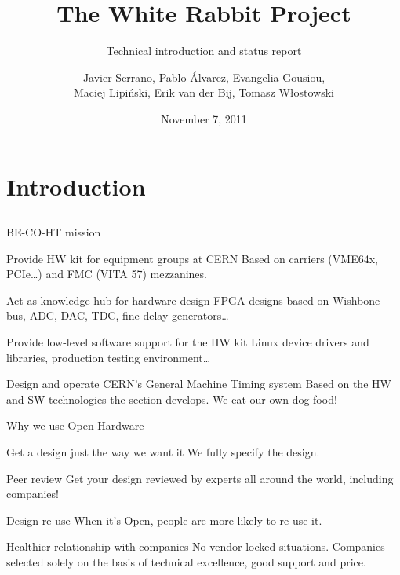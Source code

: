 \documentclass[compress,red]{beamer}
\title[WR Project Status\hspace{2em}\insertframenumber/
\inserttotalframenumber]{The White Rabbit Project}
\subtitle{Technical introduction and status report}
\author{Javier Serrano, Pablo \'A{}lvarez, Evangelia Gousiou,\\Maciej
  Lipi\'{n}ski, Erik van der Bij, Tomasz W\l{}ostowski}
\date{November 7, 2011}
\institute%
{
  BE-CO Hardware and Timing section\\
  CERN, Geneva, Switzerland
 }
\begin{document}
\frame{\titlepage}


\section{Introduction}

\subsection{}

\begin{frame}{BE-CO-HT mission}
\begin{block}{Provide HW kit for equipment groups at CERN}
Based on carriers (VME64x, PCIe\ldots) and FMC (VITA 57) mezzanines.
\end{block}
\begin{block}{Act as knowledge hub for hardware design}
FPGA designs based on Wishbone bus, ADC, DAC, TDC, fine delay generators\ldots
\end{block}
\begin{block}{Provide low-level software support for the HW kit}
Linux device drivers and libraries, production testing environment\ldots
\end{block}
\begin{block}{Design and operate CERN's General Machine
    Timing system}
Based on the HW and SW technologies the section develops. We eat our
own dog food!
\end{block}
\end{frame}

\begin{frame}{Why we use Open Hardware}
\begin{block}{Get a design just the way we want it}
We fully specify the design.
\end{block}
\begin{block}{Peer review}
Get your design reviewed by experts all around the world, including companies!
\end{block}
\begin{block}{Design re-use}
When it's Open, people are more likely to re-use it.
\end{block}
\begin{block}{Healthier relationship with companies}
No vendor-locked situations. Companies selected solely on the basis of
technical excellence, good support and price.
\end{block}
\end{frame}
\end{document}
